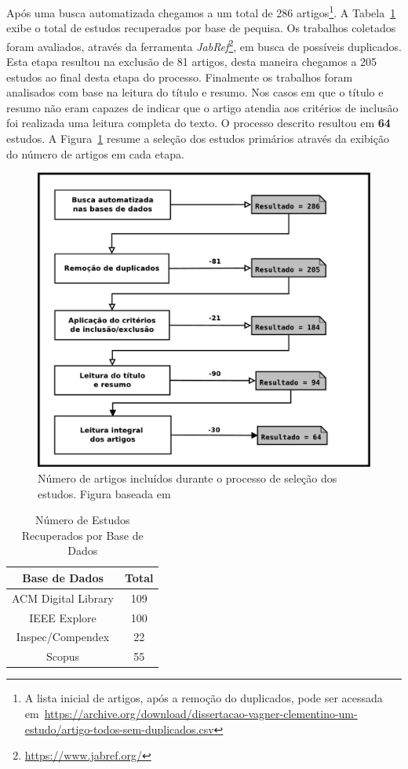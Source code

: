 Após uma busca automatizada chegamos a um total de 286 artigos\footnote{A lista
    inicial de artigos, após a remoção do duplicados, pode ser acessada
    em~\url{https://archive.org/download/dissertacao-vagner-clementino-um-estudo/artigo-todos-sem-duplicados.csv}}.
A Tabela~\ref{tab:estudos-por-base-dados} exibe o total de estudos recuperados
por base de pequisa. Os trabalhos coletados foram avaliados, através da
ferramenta \textit{JabRef}\footnote{\url{https://www.jabref.org/}}, em busca de
possíveis duplicados. Esta etapa resultou na exclusão de 81 artigos, desta
maneira chegamos a 205 estudos ao final desta etapa do processo.  Finalmente os
trabalhos foram analisados com base na leitura do título e resumo.  Nos casos
em que o título e resumo não eram capazes de indicar que o artigo atendia aos
critérios de inclusão foi realizada uma leitura completa do texto. O processo
descrito resultou em \textbf{64} estudos. A
Figura~\ref{fig:diagrama-processo-selecao} resume a seleção dos estudos
primários através da exibição do número de artigos em cada etapa.

\begin{figure} \centering \includegraphics[width=0.75\linewidth]
	{./chapter-mapeamento-sistematico/img/diagrama-processo-selecao.pdf}
	\caption{Número de artigos incluídos durante o processo de seleção dos
		estudos. Figura baseada em~\cite{Petersen2015}}
\label{fig:diagrama-processo-selecao}
\end{figure}

\begin{table}[htb]
	\centering
	\begin{tabular}{cc}
		\toprule
		\textbf{Base de Dados} & \textbf{Total} \\
		\midrule
	   	ACM Digital Library & 109\\
	   	IEEE Explore        & 100\\
		Inspec/Compendex    & 22 \\ 
		Scopus              & 55 \\
		\bottomrule
	\end{tabular}
	\caption{Número de Estudos Recuperados por Base de Dados}
\label{tab:estudos-por-base-dados}
\end{table}

